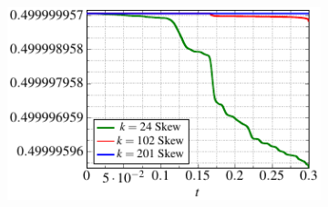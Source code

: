 \begin{figure}
\begin{subfigure}[]{0.48\linewidth}
  \end{subfigure}\hfill%
  \begin{subfigure}[]{0.48\linewidth}
          \includegraphics[scale=1]{Figures/paper-figure9.pdf}
  \end{subfigure}
  \begin{subfigure}[]{0.48\linewidth}

\end{subfigure}
\end{figure}
